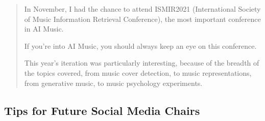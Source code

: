 \documentclass[%
10pt,								%
titlepage,						%
]
{scrartcl}
\begin{document}
\begin{itemize}
                    \begin{quote}
                        In November, I had the chance to attend ISMIR2021 (International Society of Music Information Retrieval Conference), the most important conference in AI Music.

                        If you're into AI Music, you should always keep an eye on this conference. 

                        This year's iteration was particularly interesting, because of the breadth of the topics covered, from music cover detection, to music representations, from generative music, to music psychology experiments. 
                    \end{quote}
            \end{itemize}
   
        
    \subsection{Tips for Future Social Media Chairs}
\end{document}
